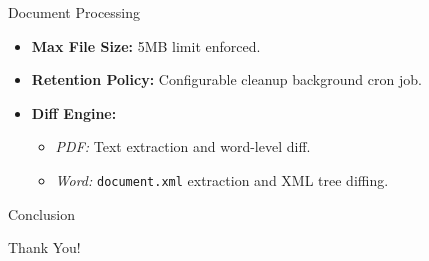 \documentclass{beamer}
\begin{document}
\begin{frame}{Document Processing}
\begin{itemize}
    \item \textbf{Max File Size:} 5MB limit enforced.
    \item \textbf{Retention Policy:} Configurable cleanup background cron job.
    \item \textbf{Diff Engine:}
    \begin{itemize}
        \item \textit{PDF:} Text extraction and word-level diff.
        \item \textit{Word:} \texttt{document.xml} extraction and XML tree diffing.
    \end{itemize}
\end{itemize}
\end{frame}

\begin{frame}{Conclusion}
\begin{center}
    \Large Thank You!
\end{center}
\end{frame}
\end{document}
